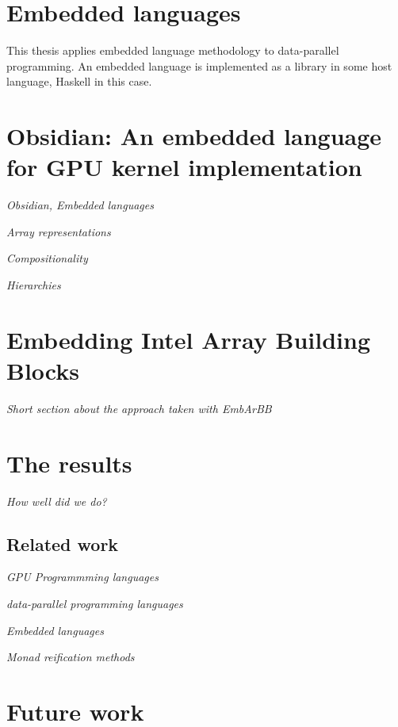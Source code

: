 \documentclass[a4paper]{book}
\begin{document}

\section{Embedded languages}

This thesis applies embedded language methodology to data-parallel programming. An 
embedded language is implemented as a library in some host language, Haskell in this case. 




\section{Obsidian: An embedded language for GPU kernel implementation}

\noindent\emph{Obsidian, Embedded languages} 

\noindent\emph{Array representations} 

\noindent\emph{Compositionality} 

\noindent\emph{Hierarchies} 

\section{Embedding Intel Array Building Blocks} 

\noindent\emph{Short section about the approach taken with EmbArBB}

\section{The results} 

\emph{ How well did we do?} 

\subsection{Related work} 

\noindent\emph{GPU Programmming languages}

\noindent\emph{data-parallel programming languages} 

\noindent\emph{Embedded languages} 

\noindent\emph{Monad reification methods} 

\section{Future work} 
\end{document}
